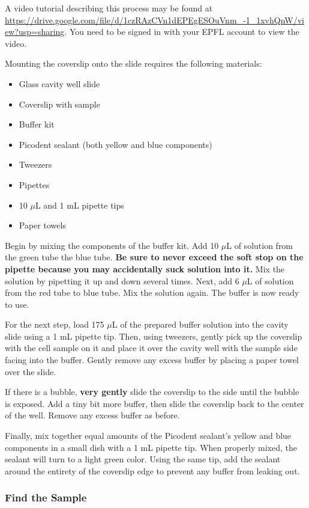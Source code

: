 \documentclass[10pt,a4paper,oneside]{book}
\begin{document}
A video tutorial describing this process may be found at \url{https://drive.google.com/file/d/1czRAzCVn1dEPEgESOuVnm_-1_1xvhQnW/view?usp=sharing}. You need to be signed in with your EPFL account to view the video.

Mounting the coverslip onto the slide requires the following materials:

\begin{itemize}
    \item{Glass cavity well slide}
    \item{Coverslip with sample}
    \item{Buffer kit}
    \item{Picodent sealant (both yellow and blue components)}
    \item{Tweezers}
    \item{Pipettes}
    \item{10 $\mu$L and 1 mL pipette tips}
    \item{Paper towels}
\end{itemize}

Begin by mixing the components of the buffer kit. Add 10 $\mu$L of solution from the green tube the blue tube. \textbf{Be sure to never exceed the soft stop on the pipette because you may accidentally suck solution into it.} Mix the solution by pipetting it up and down several times. Next, add 6 $\mu$L of solution from the red tube to blue tube. Mix the solution again. The buffer is now ready to use.

For the next step, load 175 $\mu$L of the prepared buffer solution into the cavity slide using a 1 mL pipette tip. Then, using tweezers, gently pick up the coverslip with the cell sample on it and place it over the cavity well with the sample side facing into the buffer. Gently remove any excess buffer by placing a paper towel over the slide.

If there is a bubble, \textbf{very gently} slide the coverslip to the side until the bubble is exposed. Add a tiny bit more buffer, then slide the coverslip back to the center of the well. Remove any excess buffer as before.

Finally, mix together equal amounts of the Picodent sealant's yellow and blue components in a small dish with a 1 mL pipette tip. When properly mixed, the sealant will turn to a light green color. Using the same tip, add the sealant around the entirety of the coverslip edge to prevent any buffer from leaking out.

\subsubsection{Find the Sample}
\end{document}
